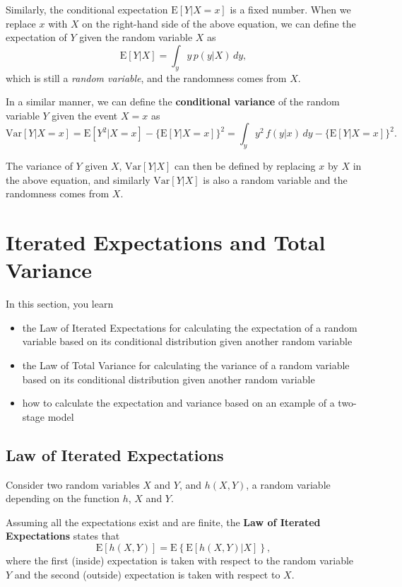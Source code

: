 \documentclass[]{book}
\providecommand{\tightlist}{%
  \setlength{\itemsep}{0pt}\setlength{\parskip}{0pt}}
\theoremstyle{definition}
\theoremstyle{definition}
\theoremstyle{definition}
\theoremstyle{remark}
\begin{document}
Similarly, the conditional expectation \(\mathrm{E}[Y|X=x]\) is a fixed
number. When we replace \(x\) with \(X\) on the right-hand side of the
above equation, we can define the expectation of \(Y\) given the random
variable \(X\) as \[\mathrm{E}[Y|X]=\int_y y\,p(y|X)\,dy,\] which is
still a \emph{random variable}, and the randomness comes from \(X\).

In a similar manner, we can define the \textbf{conditional variance} of
the random variable \(Y\) given the event \(X=x\) as
\[\mathrm{Var}[Y|X=x]=\mathrm{E}[Y^2|X=x]-\{\mathrm{E}[Y|X=x]\}^2=\int_y y^2\,f(y|x)\,dy-\{\mathrm{E}[Y|X=x]\}^2.\]

The variance of \(Y\) given \(X\), \(\mathrm{Var}[Y|X]\) can then be
defined by replacing \(x\) by \(X\) in the above equation, and similarly
\(\mathrm{Var}[Y|X]\) is also a random variable and the randomness comes
from \(X\).

\section{Iterated Expectations and Total Variance}\label{S:AppB:IE}

In this section, you learn

\begin{itemize}
\tightlist
\item
  the Law of Iterated Expectations for calculating the expectation of a
  random variable based on its conditional distribution given another
  random variable
\item
  the Law of Total Variance for calculating the variance of a random
  variable based on its conditional distribution given another random
  variable
\item
  how to calculate the expectation and variance based on an example of a
  two-stage model
\end{itemize}

\subsection{Law of Iterated
Expectations}\label{law-of-iterated-expectations}

Consider two random variables \(X\) and \(Y\), and \(h(X,Y)\), a random
variable depending on the function \(h\), \(X\) and \(Y\).

Assuming all the expectations exist and are finite, the \textbf{Law of
Iterated Expectations} states that
\[\mathrm{E}[h(X,Y)]= \mathrm{E} \left\{ \mathrm{E} \left[ h(X,Y) | X \right] \right \},\]
where the first (inside) expectation is taken with respect to the random
variable \(Y\) and the second (outside) expectation is taken with
respect to \(X\).
\end{document}

